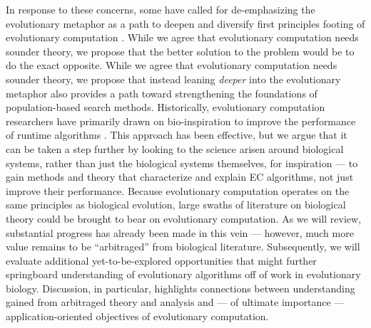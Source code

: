 In response to these concerns, some have called for de-emphasizing the evolutionary metaphor as a path to deepen and diversify first principles footing of evolutionary computation \citep{moore2023evolution}.
While we agree that evolutionary computation needs sounder theory, we propose that the better solution to the problem would be to do the exact opposite.
While we agree that evolutionary computation needs sounder theory, we propose that instead leaning \textit{deeper} into the evolutionary metaphor also provides a path toward strengthening the foundations of population-based search methods.
Historically, evolutionary computation researchers have primarily drawn on bio-inspiration to improve the performance of runtime algorithms \citep{banzhaf2006artificial,kumar2003biologically,mcphee2009developmental}.
This approach has been effective, but we argue that it can be taken a step further by looking to the science arisen around biological systems, rather than just the biological systems themselves, for inspiration --- to gain methods and theory that characterize and explain EC algorithms, not just improve their performance.
Because evolutionary computation operates on the same principles as biological evolution, large swaths of literature on biological theory could be brought to bear on evolutionary computation.
As we will review, substantial progress has already been made in this vein --- however, much more value remains to be ``arbitraged'' from biological literature.
Subsequently, we will evaluate additional yet-to-be-explored opportunities that might further springboard understanding of evolutionary algorithms off of work in evolutionary biology.
Discussion, in particular, highlights connections between understanding gained from arbitraged theory and analysis and --- of ultimate importance --- application-oriented objectives of evolutionary computation.

